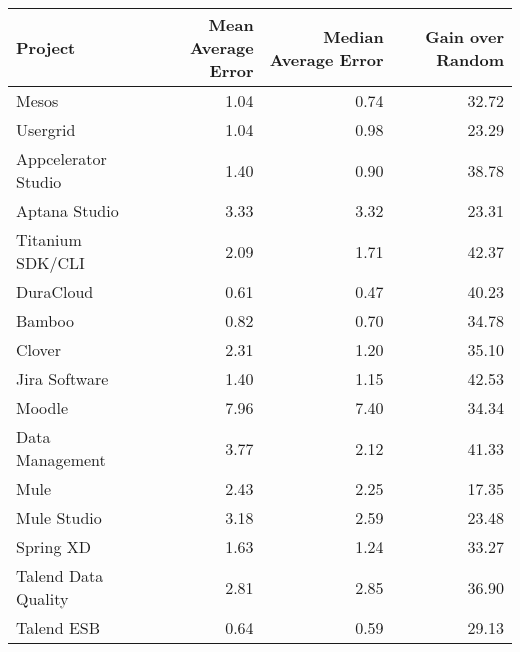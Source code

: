\begin{tabular}{lrrr}
\toprule
             Project &  Mean Average Error &  Median Average Error &  Gain over Random \\
\midrule
               Mesos &                1.04 &                  0.74 &             32.72 \\
            Usergrid &                1.04 &                  0.98 &             23.29 \\
 Appcelerator Studio &                1.40 &                  0.90 &             38.78 \\
       Aptana Studio &                3.33 &                  3.32 &             23.31 \\
    Titanium SDK/CLI &                2.09 &                  1.71 &             42.37 \\
           DuraCloud &                0.61 &                  0.47 &             40.23 \\
              Bamboo &                0.82 &                  0.70 &             34.78 \\
              Clover &                2.31 &                  1.20 &             35.10 \\
       Jira Software &                1.40 &                  1.15 &             42.53 \\
              Moodle &                7.96 &                  7.40 &             34.34 \\
     Data Management &                3.77 &                  2.12 &             41.33 \\
                Mule &                2.43 &                  2.25 &             17.35 \\
         Mule Studio &                3.18 &                  2.59 &             23.48 \\
           Spring XD &                1.63 &                  1.24 &             33.27 \\
 Talend Data Quality &                2.81 &                  2.85 &             36.90 \\
          Talend ESB &                0.64 &                  0.59 &             29.13 \\
\bottomrule
\end{tabular}
